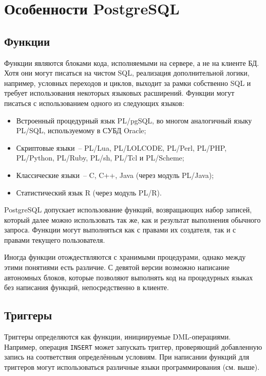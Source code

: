 \section{Особенности PostgreSQL}\label{sec:postgresql-features}

\subsection{Функции}\label{subsec:functions}

Функции являются блоками кода, исполняемыми на сервере, а не на клиенте БД. Хотя они могут писаться на чистом SQL, реализация дополнительной логики, например, условных переходов и циклов, выходит за рамки собственно SQL и требует использования некоторых языковых расширений. Функции могут писаться с использованием одного из следующих языков:
\begin{itemize}
    \item Встроенный процедурный язык PL/pgSQL, во многом аналогичный языку PL/SQL, используемому в СУБД Oracle;
    \item Скриптовые языки -- PL/Lua, PL/LOLCODE, PL/Perl, PL/PHP, PL/Python, PL/Ruby, PL/sh, PL/Tcl и PL/Scheme;
    \item Классические языки -- C, C++, Java (через модуль PL/Java);
    \item Статистический язык R (через модуль PL/R).
\end{itemize}

PostgreSQL допускает использование функций, возвращающих набор записей, который далее можно использовать так же, как и результат выполнения обычного запроса.
Функции могут выполняться как с правами их создателя, так и с правами текущего пользователя.

Иногда функции отождествляются с хранимыми процедурами, однако между этими понятиями есть различие. С девятой версии возможно написание автономных блоков, которые позволяют выполнять код на процедурных языках без написания функций, непосредственно в клиенте.

\subsection{Триггеры}\label{subsec:triggers}

Триггеры определяются как функции, инициируемые DML-операциями. Например, операция \texttt{INSERT} может запускать триггер, проверяющий добавленную запись на соответствия определённым условиям. При написании функций для триггеров могут использоваться различные языки программирования (см. выше). %

